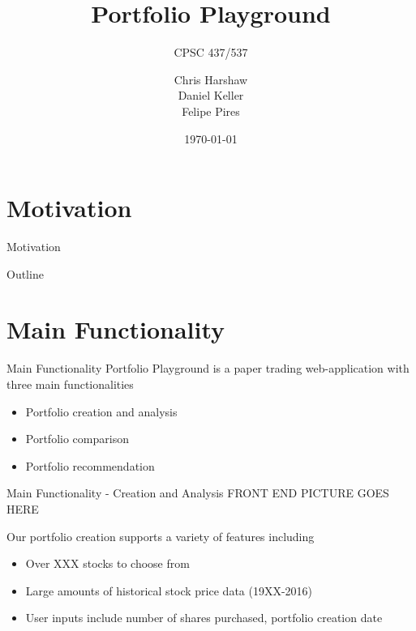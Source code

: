 \documentclass{beamer}
\title{Portfolio Playground}
\subtitle{CPSC 437/537}
\author{Chris Harshaw \\ Daniel Keller \\ Felipe Pires}
\date{\today}
\begin{document}
\begin{frame}
  \titlepage
\end{frame}

\section*{Motivation}
\begin{frame}{Motivation}
  
\end{frame}

\begin{frame}{Outline}
  \tableofcontents
\end{frame}

\section{Main Functionality}

\begin{frame}{Main Functionality}
Portfolio Playground is a paper trading web-application with three main functionalities \\

	\begin{itemize}
		\item Portfolio creation and analysis
		\item Portfolio comparison
		\item Portfolio recommendation
	\end{itemize}

\end{frame}

\begin{frame}{Main Functionality - Creation and Analysis}
FRONT END PICTURE GOES HERE

Our portfolio creation supports a variety of features including
	\begin{itemize}
		\item Over XXX stocks to choose from
		\item Large amounts of historical stock price data (19XX-2016)
		\item User inputs include number of shares purchased, portfolio creation date
	\end{itemize}
\end{frame}
\end{document}
